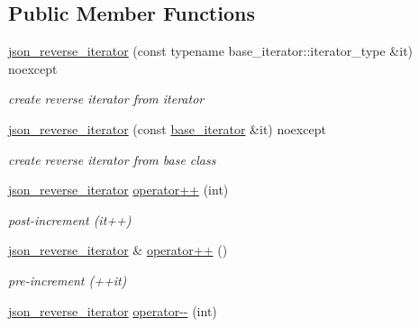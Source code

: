 \subsection*{Public Member Functions}
\begin{DoxyCompactItemize}
\item 
\hyperlink{a00080_a86c97bbb8ebe19aef4656cf796e30e99}{json\+\_\+reverse\+\_\+iterator} (const typename base\+\_\+iterator\+::iterator\+\_\+type \&it) noexcept\hypertarget{a00080_a86c97bbb8ebe19aef4656cf796e30e99}{}\label{a00080_a86c97bbb8ebe19aef4656cf796e30e99}

\begin{DoxyCompactList}\small\item\em create reverse iterator from iterator \end{DoxyCompactList}\item 
\hyperlink{a00080_a530f042e2ab1c83dddfc344931b0375a}{json\+\_\+reverse\+\_\+iterator} (const \hyperlink{a00080_a9ebc4c99e6fc90c965af0f39ad2ca70e}{base\+\_\+iterator} \&it) noexcept\hypertarget{a00080_a530f042e2ab1c83dddfc344931b0375a}{}\label{a00080_a530f042e2ab1c83dddfc344931b0375a}

\begin{DoxyCompactList}\small\item\em create reverse iterator from base class \end{DoxyCompactList}\item 
\hyperlink{a00080}{json\+\_\+reverse\+\_\+iterator} \hyperlink{a00080_a545a8204cfd6836eb85abc3113a0bb28}{operator++} (int)\hypertarget{a00080_a545a8204cfd6836eb85abc3113a0bb28}{}\label{a00080_a545a8204cfd6836eb85abc3113a0bb28}

\begin{DoxyCompactList}\small\item\em post-\/increment (it++) \end{DoxyCompactList}\item 
\hyperlink{a00080}{json\+\_\+reverse\+\_\+iterator} \& \hyperlink{a00080_a4aede52d6ee253a510897518b59e09c0}{operator++} ()\hypertarget{a00080_a4aede52d6ee253a510897518b59e09c0}{}\label{a00080_a4aede52d6ee253a510897518b59e09c0}

\begin{DoxyCompactList}\small\item\em pre-\/increment (++it) \end{DoxyCompactList}\item 
\hyperlink{a00080}{json\+\_\+reverse\+\_\+iterator} \hyperlink{a00080_a693439bffe56a9a8cf53bc4a06b911ff}{operator-\/-\/} (int)\hypertarget{a00080_a693439bffe56a9a8cf53bc4a06b911ff}{}\label{a00080_a693439bffe56a9a8cf53bc4a06b911ff}


\end{DoxyCompactItemize}

